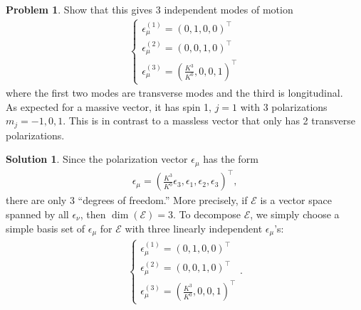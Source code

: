 \documentclass[a4paper,11pt]{article}
\numberwithin{equation}{section}
\theoremstyle{definition}
\newtheorem{prob}{Problem}[section]
\newtheorem{sln}{Solution}[section]
\begin{document}
\begin{prob}
	Show that this gives 3 independent modes of motion
	\begin{align*}
	\begin{cases}
	\epsilon^{(1)}_\mu = (0,1,0,0)^\top\\
	\epsilon^{(2)}_\mu = (0,0,1,0)^\top\\
	\epsilon^{(3)}_\mu = \left(\frac{K^3}{K^0},0,0,1\right)^\top
	\end{cases}
	\end{align*}
	where the first two modes are transverse modes and the third is longitudinal.\\
	
	As expected for a massive vector, it has spin 1, $j=1$ with 3 polarizations $m_j = -1,0,1$. This is in contrast to a massless vector that only has 2 transverse polarizations. \\
	
	\begin{sln}
		Since the polarization vector $\epsilon_\mu$ has the form
		\begin{align*}
		\epsilon_\mu = \left(\frac{K^3}{K^0}\epsilon_3,\epsilon_1,\epsilon_2,\epsilon_3 \right)^\top,
		\end{align*}
		there are only 3 ``degrees of freedom.'' More precisely, if $\mathcal{E}$ is a vector space spanned by all $\epsilon_\nu$, then $\dim(\mathcal{E}) = 3$. To decompose $\mathcal{E}$, we simply choose a simple basis set of $\epsilon_\mu$ for $\mathcal{E}$ with three linearly independent $\epsilon_\mu$'s:
		\begin{align*}
		\begin{cases}
		\epsilon^{(1)}_\mu = (0,1,0,0)^\top\\
		\epsilon^{(2)}_\mu = (0,0,1,0)^\top\\
		\epsilon^{(3)}_\mu = \left(\frac{K^3}{K^0},0,0,1\right)^\top
		\end{cases}.
		\end{align*}
	\end{sln}
\end{prob}
\end{document}
